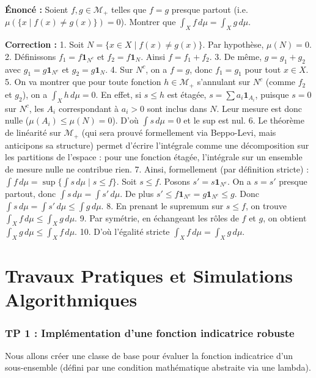 \documentclass[11pt,a4paper]{article}
\begin{document}
\textbf{Énoncé :}
Soient $f, g \in \mathcal{M}_+$ telles que $f = g$ presque partout (i.e. $\mu(\{x \mid f(x) \neq g(x)\}) = 0$).
Montrer que $\int_X f \, d\mu = \int_X g \, d\mu$.

\textbf{Correction :}
1. Soit $N = \{x \in X \mid f(x) \neq g(x)\}$. Par hypothèse, $\mu(N) = 0$.
2. Définissons $f_1 = f \mathbf{1}_{N^c}$ et $f_2 = f \mathbf{1}_N$. Ainsi $f = f_1 + f_2$.
3. De même, $g = g_1 + g_2$ avec $g_1 = g \mathbf{1}_{N^c}$ et $g_2 = g \mathbf{1}_N$.
4. Sur $N^c$, on a $f = g$, donc $f_1 = g_1$ pour tout $x \in X$.
5. On va montrer que pour toute fonction $h \in \mathcal{M}_+$ s'annulant sur $N^c$ (comme $f_2$ et $g_2$), on a $\int_X h \, d\mu = 0$.
   En effet, si $s \le h$ est étagée, $s = \sum a_i \mathbf{1}_{A_i}$, puisque $s = 0$ sur $N^c$, les $A_i$ correspondant à $a_i > 0$ sont inclus dans $N$.
   Leur mesure est donc nulle ($\mu(A_i) \le \mu(N) = 0$). D'où $\int s \, d\mu = 0$ et le sup est nul.
6. Le théorème de linéarité sur $\mathcal{M}_+$ (qui sera prouvé formellement via Beppo-Levi, mais anticipons sa structure) permet d'écrire l'intégrale comme une décomposition sur les partitions de l'espace : pour une fonction étagée, l'intégrale sur un ensemble de mesure nulle ne contribue rien.
7. Ainsi, formellement (par définition stricte) :
   $\int f \, d\mu = \sup \{ \int s \, d\mu \mid s \le f \}$.
   Soit $s \le f$. Posons $s' = s \mathbf{1}_{N^c}$. On a $s = s'$ presque partout, donc $\int s \, d\mu = \int s' \, d\mu$.
   De plus $s' \le f \mathbf{1}_{N^c} = g \mathbf{1}_{N^c} \le g$.
   Donc $\int s \, d\mu = \int s' \, d\mu \le \int g \, d\mu$.
8. En prenant le supremum sur $s \le f$, on trouve $\int_X f \, d\mu \le \int_X g \, d\mu$.
9. Par symétrie, en échangeant les rôles de $f$ et $g$, on obtient $\int_X g \, d\mu \le \int_X f \, d\mu$.
10. D'où l'égalité stricte $\int_X f \, d\mu = \int_X g \, d\mu$.




\newpage
\part{Travaux Pratiques et Simulations Algorithmiques}
\section{TP 1 : Implémentation d'une fonction indicatrice robuste}

Nous allons créer une classe de base pour évaluer la fonction indicatrice d'un sous-ensemble (défini par une condition mathématique abstraite via une lambda).
\end{document}
